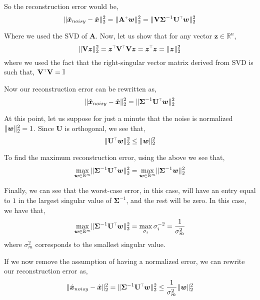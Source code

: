 \documentclass[SE,authoryear,toc]{lsstdoc}
\renewcommand{\v}[1]{\mathbf{#1}}
\newcommand{\plus}{\scalebox{0.6}{$+$}}
\newcommand{\tr}{\scalebox{0.6}{$\top$}}
\DeclarePairedDelimiter{\norm}{\lVert}{\rVert}
\begin{document}
So the reconstruction error would be, 
\begin{equation}
    \norm{\hat{\bm{x}}_{noisy} - \hat{\bm{x}}}_2^2 = \norm{\v{A}^{\plus}\bm{w} }_2^2 = \norm{\v{V}\v{\Sigma}^{-1}\v{U}^{\tr}\bm{w} }_2^2
\end{equation}

Where we used the SVD of $\v{A}$. Now, let us show that for any vector $\bm{z} \in \mathbb{R}^n$, 
\begin{equation}
    \norm{\v{V}\bm{z}}_2^2 = \bm{z}^{\tr}\v{V}^{\tr}\v{V}\bm{z} = \bm{z}^{\tr}\bm{z} =  \norm{\bm{z}}_2^2
\end{equation}
where we used the fact that the right-singular vector matrix derived from SVD is such that, $\v{V}^{\tr}\v{V} = \mathbb{I}$

Now our reconstruction error can be rewritten as, 
\begin{equation}
    \norm{\hat{\bm{x}}_{noisy} - \hat{\bm{x}}}_2^2 = \norm{\v{\Sigma}^{-1}\v{U}^{\tr}\bm{w} }_2^2
\end{equation}

At this point, let us suppose for just a minute that the noise is normalized $\norm{\bm{w}}_2^2 = 1$. Since $\v{U}$ is orthogonal, we see that, 
\begin{equation}
    \norm{\v{U}^{\tr}\bm{w}}_2^2 \leq \norm{\bm{w}}^2_2
\end{equation}

To find the maximum reconstruction error, using the above we see that, 
\begin{equation}
    \max_{\bm{w} \in \mathbb{R}^m} \norm{\v{\Sigma}^{-1}\v{U}^{\tr}\bm{w} }_2^2 = \max_{\bm{w} \in \mathbb{R}^m} \norm{\v{\Sigma}^{-1}\bm{w} }_2^2
\end{equation}

Finally, we can see that the worst-case error, in this case, will have an entry equal to $1$ in the largest singular value of $\v{\Sigma}^{-1}$, and the rest will be zero. In this case, we have that,
\begin{equation}
    \max_{\bm{w} \in \mathbb{R}^m} \norm{\v{\Sigma}^{-1}\v{U}^{\tr}\bm{w} }_2^2 = \max_{\sigma_i} \sigma_i^{-2} = \frac{1}{\sigma_m^2}
\end{equation}
where $\sigma_m^2$ corresponds to the smallest singular value. 

If we now remove the assumption of having a normalized error, we can rewrite our reconstruction error as, 
\begin{equation}
    \norm{\hat{\bm{x}}_{noisy} - \hat{\bm{x}}}_2^2 = \norm{\v{\Sigma}^{-1}\v{U}^{\tr}\bm{w} }_2^2 \leq  \frac{1}{\sigma_m^2} \norm{\bm{w}}^2_2
\end{equation}
\end{document}
